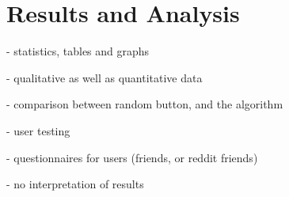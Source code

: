 \chapter{Results and Analysis}
\label{chapterlabel4}

- statistics, tables and graphs

- qualitative as well as quantitative data

- comparison between random button, and the algorithm

- user testing

- questionnaires for users (friends, or reddit friends)

- no interpretation of results